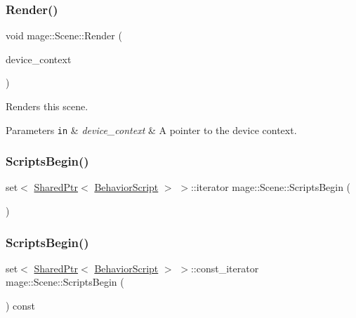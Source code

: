 \hypertarget{classmage_1_1_scene_a39bcf9a202d35558f03112aa2c99090d}{}\label{classmage_1_1_scene_a39bcf9a202d35558f03112aa2c99090d} 
\subsubsection{\texorpdfstring{Render()}{Render()}}
{\footnotesize\ttfamily void mage\+::\+Scene\+::\+Render (\begin{DoxyParamCaption}\item[{I\+D3\+D11\+Device\+Context2 \&}]{device\+\_\+context }\end{DoxyParamCaption})}

Renders this scene.


\begin{DoxyParams}[1]{Parameters}
\mbox{\tt in}  & {\em device\+\_\+context} & A pointer to the device context. \\
\hline
\end{DoxyParams}
\hypertarget{classmage_1_1_scene_a2f6106acc0e29378736cf8e9bbcd8c20}{}\label{classmage_1_1_scene_a2f6106acc0e29378736cf8e9bbcd8c20} 
\subsubsection{\texorpdfstring{Scripts\+Begin()}{ScriptsBegin()}\hspace{0.1cm}{\footnotesize\ttfamily [1/2]}}
{\footnotesize\ttfamily set$<$ \hyperlink{namespacemage_a1e01ae66713838a7a67d30e44c67703e}{Shared\+Ptr}$<$ \hyperlink{classmage_1_1_behavior_script}{Behavior\+Script} $>$ $>$\+::iterator mage\+::\+Scene\+::\+Scripts\+Begin (\begin{DoxyParamCaption}{ }\end{DoxyParamCaption})}

\hypertarget{classmage_1_1_scene_abf8804b118e5ba4736ece404da0fbf90}{}\label{classmage_1_1_scene_abf8804b118e5ba4736ece404da0fbf90} 
\subsubsection{\texorpdfstring{Scripts\+Begin()}{ScriptsBegin()}\hspace{0.1cm}{\footnotesize\ttfamily [2/2]}}
{\footnotesize\ttfamily set$<$ \hyperlink{namespacemage_a1e01ae66713838a7a67d30e44c67703e}{Shared\+Ptr}$<$ \hyperlink{classmage_1_1_behavior_script}{Behavior\+Script} $>$ $>$\+::const\+\_\+iterator mage\+::\+Scene\+::\+Scripts\+Begin (\begin{DoxyParamCaption}{ }\end{DoxyParamCaption}) const}

